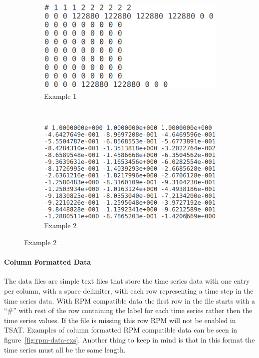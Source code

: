 \documentclass[titlepage, letterpaper, 12pt]{article}
\begin{document}
\begin{figure}[h]
	\caption{Examples of RPM Data}
	\label{fig:rpm-data-exs}
	\begin{subfigure}[b]{0.5\textwidth}
		\includegraphics[width=\textwidth]{rpm_data_example_1}
		\caption{Example 1}
		\label{fig:rpm-data-ex-1}
	\end{subfigure}
	~
	\begin{subfigure}[b]{0.5\textwidth}
		\includegraphics[width=\textwidth]{rpm_data_example_2}
		\caption{Example 2}
		\label{fig:rpm-data-ex-2}
	\end{subfigure}
\end{figure}

\paragraph{Column Formatted Data}
The data files are simple text files that store the time series data with one entry per column, with a space delimiter, with each row representing a time step in the time series data. With RPM compatible data the first row in the file starts with a ``\#'' with rest of the row containing the label for each time series rather then the time series values. If the file is missing this row RPM will not be enabled in TSAT. Examples of column formatted RPM compatible data can be seen in figure~\ref{fig:rpm-data-exs}.  Another thing to keep in mind is that in this format the time series must all be the same length. 
\end{document}
